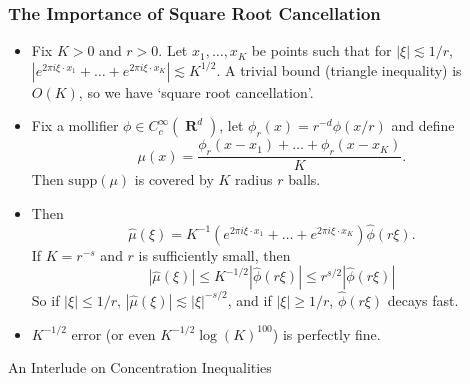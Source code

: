 \documentclass[usenames,dvipsnames,handout]{beamer}
\DeclareMathOperator{\RR}{\textbf{R}}
\begin{document}
\begin{frame}
    \frametitle{The Importance of Square Root Cancellation}

\begin{itemize}
    \item Fix $K > 0$ and $r > 0$. Let $x_1,\dots,x_K$ be points such that for $|\xi| \lesssim 1/r$, $|e^{2 \pi i \xi \cdot x_1} + \dots + e^{2 \pi i \xi \cdot x_K}| \lesssim K^{1/2}$. A trivial bound (triangle inequality) is $O(K)$, so we have `square root cancellation'.

    \item Fix a mollifier $\phi \in C_c^\infty(\RR^d)$, let $\phi_r(x) = r^{-d} \phi(x/r)$ and define
    \[ \mu(x) = \frac{\phi_r(x - x_1) + \dots + \phi_r(x - x_K)}{K}. \]
    Then $\text{supp}(\mu)$ is covered by $K$ radius $r$ balls.

    \item Then
    \[ \widehat{\mu}(\xi) = K^{-1} \left( e^{2 \pi i \xi \cdot x_1} + \dots + e^{2 \pi i \xi \cdot x_K} \right) \widehat{\phi}(r\xi). \]
    If $K = r^{-s}$ and $r$ is sufficiently small, then
    \[ |\widehat{\mu}(\xi)| \leq K^{-1/2} |\widehat{\phi}(r\xi)| \leq r^{s/2} |\widehat{\phi}(r\xi)| \]
    So if $|\xi| \leq 1/r$, $|\widehat{\mu}(\xi)| \lesssim |\xi|^{-s/2}$, and if $|\xi| \geq 1/r$, $\widehat{\phi}(r \xi)$ decays fast.

    \item $K^{-1/2}$ error (or even $K^{-1/2} \log(K)^{100}$) is perfectly fine.
\end{itemize}

\end{frame}




\begin{frame}

An Interlude on Concentration Inequalities

\end{frame}
\end{document}

